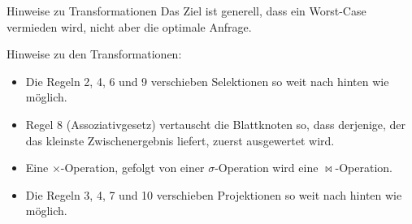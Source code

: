 \begin{bonus}{Hinweise zu Transformationen}
    Das Ziel ist generell, dass ein Worst-Case vermieden wird, nicht aber die optimale Anfrage.

    Hinweise zu den Transformationen:
    \begin{itemize}
        \item Die Regeln 2, 4, 6 und 9 verschieben Selektionen so weit nach hinten wie möglich.
        \item Regel 8 (Assoziativgesetz) vertauscht die Blattknoten so, dass derjenige, der das kleinste Zwischenergebnis liefert, zuerst ausgewertet wird.
        \item Eine $\times$-Operation, gefolgt von einer $\sigma$-Operation wird eine $\bowtie$-Operation.
        \item Die Regeln 3, 4, 7 und 10 verschieben Projektionen so weit nach hinten wie möglich.
    \end{itemize}
\end{bonus}

